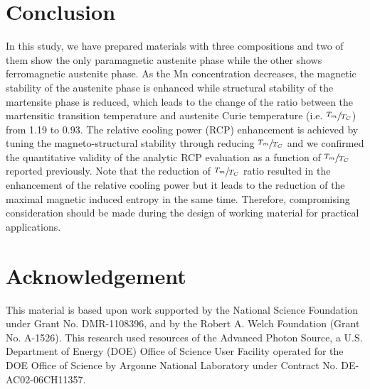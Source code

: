 \documentclass[sort&compress,twocolumn,3p]{elsarticle}
\begin{document}
\section{Conclusion}
In this study, we have prepared materials with three compositions and two of them show the only paramagnetic austenite phase while the other shows ferromagnetic austenite phase.
As the Mn concentration decreases, the magnetic stability of the austenite phase is enhanced while structural stability of the martensite phase is reduced,
   which leads to the change of the ratio between the martensitic transition temperature and austenite Curie temperature (i.e. $\sfrac{T_m}{T_C}$) from 1.19 to 0.93.
The relative cooling power (RCP) enhancement is achieved by tuning the magneto-structural stability through reducing $\sfrac{T_m}{T_C}$ and we confirmed the quantitative validity of the analytic RCP evaluation as a function of $\sfrac{T_m}{T_C}$ reported previously\cite{Chen2016176}.
Note that the reduction of $\sfrac{T_m}{T_C}$ ratio resulted in the enhancement of the relative cooling power but it leads to the reduction of the maximal magnetic induced entropy in the same time.
Therefore, compromising consideration should be made during the design of working material for practical applications.

\section*{Acknowledgement}
This material is based upon work supported by the National Science Foundation under Grant No. DMR-1108396, and by the Robert A. Welch Foundation (Grant No. A-1526).
This research used resources of the Advanced Photon Source, a U.S. Department of Energy (DOE) Office of Science User Facility operated for the DOE Office of Science by Argonne National Laboratory under Contract No. DE-AC02-06CH11357.




\end{document}

